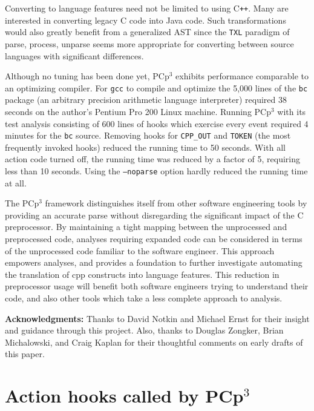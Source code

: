 \documentclass{article}
\newcommand{\pcp}{\mbox{\textsf{PCp}$^3$}}
\newcommand{\Cpp}{\mbox{\textsf{cpp}}}
\newcommand{\CPP}{\mbox{C\texttt{++}}}
\newcommand{\C}{\mbox{C}}
\begin{document}
Converting to language features need not be limited to using \CPP{}.
Many are interested in converting legacy \C{} code into Java code.  Such
transformations would also greatly benefit from a generalized AST since
the \texttt{TXL} paradigm of parse, process, unparse \cite{TXL} seems
more appropriate for converting between source languages with
significant differences.

Although no tuning has been done yet, \pcp{} exhibits performance
comparable to an optimizing compiler.  For \texttt{gcc} to compile and
optimize the 5,000 lines of the \texttt{bc} package (an arbitrary
precision arithmetic language interpreter) required 38 seconds on the
author's Pentium Pro 200 Linux machine. Running \pcp{} with its test
analysis consisting of 600 lines of hooks which exercise every event
required 4 minutes for the \texttt{bc} source.  Removing hooks for
\texttt{CPP\_OUT} and \texttt{TOKEN} (the most frequently invoked hooks)
reduced the running time to 50 seconds.  With all action code turned
off, the running time was reduced by a factor of 5, requiring less than
10 seconds.  Using the \texttt{--noparse} option hardly reduced the
running time at all.

The \pcp{} framework distinguishes itself from other software
engineering tools by providing an accurate parse without disregarding
the significant impact of the \C{} preprocessor.  By maintaining a tight
mapping between the unprocessed and preprocessed code, analyses
requiring expanded code can be considered in terms of the unprocessed
code familiar to the software engineer.  This approach empowers
analyses, and provides a foundation to further investigate automating
the translation of \Cpp{} constructs into language features.  This
reduction in preprocessor usage will benefit both software engineers
trying to understand their code, and also other tools which take a less
complete approach to analysis.

\vspace{1in}
\noindent \textbf{Acknowledgments:}  Thanks to David Notkin and Michael
Ernst for their insight and guidance through this project.  Also, thanks
to Douglas Zongker, Brian Michalowski, and Craig Kaplan for their
thoughtful comments on early drafts of this paper.


\appendix
\newpage

\section{Action hooks called by \pcp}
\begin{footnotesize}
\label{sec:hooks}
\begin{itemize}
\sloppy

\fussy
\end{itemize}
\end{footnotesize}
\end{document}
